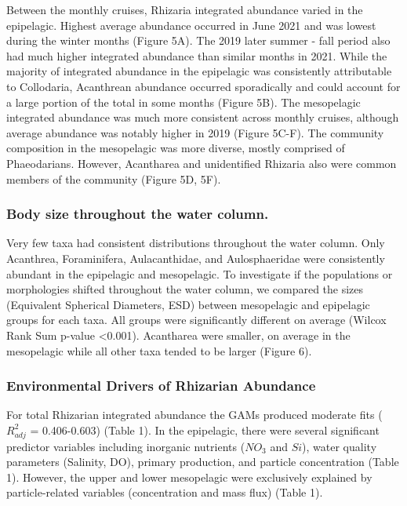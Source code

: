 \documentclass[
]{article}
\begin{document}
Between the monthly cruises, Rhizaria integrated abundance varied in the
epipelagic. Highest average abundance occurred in June 2021 and was
lowest during the winter months (Figure 5A). The 2019 later summer -
fall period also had much higher integrated abundance than similar
months in 2021. While the majority of integrated abundance in the
epipelagic was consistently attributable to Collodaria, Acanthrean
abundance occurred sporadically and could account for a large portion of
the total in some months (Figure 5B). The mesopelagic integrated
abundance was much more consistent across monthly cruises, although
average abundance was notably higher in 2019 (Figure 5C-F). The
community composition in the mesopelagic was more diverse, mostly
comprised of Phaeodarians. However, Acantharea and unidentified Rhizaria
also were common members of the community (Figure 5D, 5F).

\hypertarget{body-size-throughout-the-water-column.}{%
\subsubsection{Body size throughout the water
column.}\label{body-size-throughout-the-water-column.}}

Very few taxa had consistent distributions throughout the water column.
Only Acanthrea, Foraminifera, Aulacanthidae, and Aulosphaeridae were
consistently abundant in the epipelagic and mesopelagic. To investigate
if the populations or morphologies shifted throughout the water column,
we compared the sizes (Equivalent Spherical Diameters, ESD) between
mesopelagic and epipelagic groups for each taxa. All groups were
significantly different on average (Wilcox Rank Sum p-value
\textless0.001). Acantharea were smaller, on average in the mesopelagic
while all other taxa tended to be larger (Figure 6).

\hypertarget{environmental-drivers-of-rhizarian-abundance}{%
\subsubsection{Environmental Drivers of Rhizarian
Abundance}\label{environmental-drivers-of-rhizarian-abundance}}

For total Rhizarian integrated abundance the GAMs produced moderate fits
(\(R^2_{adj}\) = 0.406-0.603) (Table 1). In the epipelagic, there were
several significant predictor variables including inorganic nutrients
(\(NO_3\) and \(Si\)), water quality parameters (Salinity, DO), primary
production, and particle concentration (Table 1). However, the upper and
lower mesopelagic were exclusively explained by particle-related
variables (concentration and mass flux) (Table 1).
\end{document}
